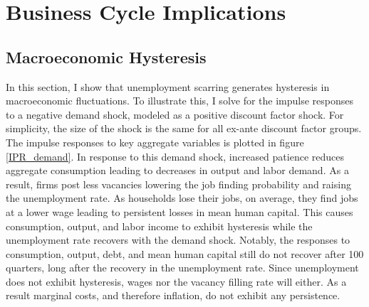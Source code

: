 \section{Business Cycle Implications}


\subsection{Macroeconomic Hysteresis}

In this section, I show that unemployment scarring generates hysteresis in macroeconomic fluctuations. To illustrate this, I solve for the impulse responses to a negative demand shock, modeled as a positive discount factor shock. For simplicity, the size of the shock is the same for all ex-ante discount factor groups. The impulse responses to key aggregate variables is plotted in figure \ref{IPR_demand}. In response to this demand shock, increased patience reduces aggregate consumption leading to decreases in output and labor demand. As a result, firms post less vacancies lowering the job finding probability and raising the unemployment rate. As households lose their jobs, on average, they find jobs at a lower wage leading to persistent losses in mean human capital. This causes consumption, output, and labor income to exhibit hysteresis while the unemployment rate recovers with the demand shock. Notably, the responses to consumption, output, debt, and mean human capital still do not recover after 100 quarters, long after the recovery in the unemployment rate. Since unemployment does not exhibit hysteresis, wages nor the vacancy filling rate will either. As a result marginal costs, and therefore inflation, do not exhibit any persistence. 


